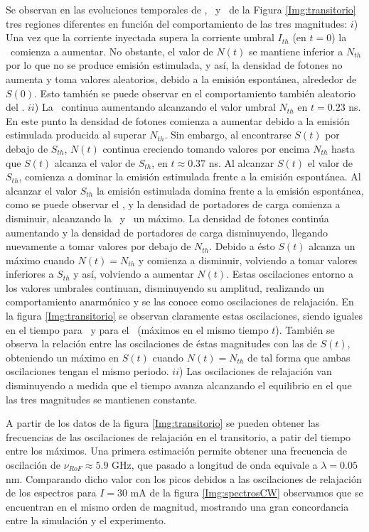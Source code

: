 				Se observan en las evoluciones temporales de \n, \s\ y \fase\ de la Figura \ref{Img:transitorio} tres regiones diferentes en funci\'on del comportamiento de las tres magnitudes: $i$) Una vez que la corriente inyectada supera la corriente umbral $I_{th}$ (en $t=0$) la \n\ comienza a aumentar. No obstante, el valor de $N(t)$ se mantiene inferior a $N_{th}$ por lo que no se produce emisión estimulada, y as\'i, la densidad de fotones no aumenta y toma valores aleatorios, debido a la emisi\'on espont\'anea, alrededor de $S(0)$. Esto tambi\'en se puede observar en el comportamiento tambi\'en aleatorio del \chirp. $ii$) La \n\ continua aumentando alcanzando el valor umbral $N_{th}$ en $t = 0.23$ ns. En este punto la densidad de fotones comienza a aumentar debido a la emisi\'on estimulada producida al superar $N_{th}$. Sin embargo, al encontrarse $S(t)$ por debajo de $S_{th}$, $N(t)$ continua creciendo tomando valores por encima $N_{th}$ hasta que $S(t)$ alcanza el valor de $S_{th}$, en $t \approx 0.37$ ns. Al alcanzar $S(t)$ el valor de $S_{th}$, comienza a dominar la emisi\'on estimulada frente a la emisi\'on espont\'anea. Al alcanzar el valor $S_{th}$ la emisi\'on estimulada domina frente a la emisi\'on espont\'anea, como se puede observar el \chirp, y la densidad de portadores de carga comienza a disminuir, alcanzando la \n\ y \chirp\ un m\'aximo. La densidad de fotones contin\'ua aumentando y la densidad de portadores de carga disminuyendo, llegando nuevamente a tomar valores por debajo de $N_{th}$. Debido a \'esto $S(t)$ alcanza un m\'aximo cuando $N(t) = N_{th}$ y comienza a disminuir, volviendo a tomar valores inferiores a $S_{th}$ y as\'i, volviendo a aumentar $N(t)$. Estas oscilaciones entorno a los valores umbrales continuan, disminuyendo su amplitud, realizando un comportamiento anarm\'onico y se las conoce como oscilaciones de relajaci\'on. En la figura \ref{Img:transitorio} se observan claramente estas oscilaciones, siendo iguales en el tiempo para \n\ y para el \chirp\ (m\'aximos en el mismo tiempo $t$). Tambi\'en se observa la relaci\'on entre las oscilaciones de \'estas magnitudes con las de $S(t)$, obteniendo un m\'aximo en $S(t)$ cuando $N(t) = N_{th}$ de tal forma que ambas oscilaciones tengan el mismo periodo. $ii$) Las oscilaciones de relajaci\'on van disminuyendo a medida que el tiempo avanza alcanzando el equilibrio en el que las tres magnitudes se mantienen constante.

				A partir de los datos de la figura \ref{Img:transitorio} se pueden obtener las frecuencias de las oscilaciones de relajaci\'on en el transitorio, a patir del tiempo entre los m\'aximos. Una primera estimaci\'on permite obtener una frecuencia de oscilaci\'on de $\nu_{RoF} \approx 5.9$ GHz, que pasado a longitud de onda equivale a $\lambda = 0.05$ nm. Comparando dicho valor con los picos debidos a las oscilaciones de relajaci\'on de los espectros para $I = 30$ mA de la figura \ref{Img:spectrosCW} observamos que se encuentran en el mismo orden de magnitud, mostrando una gran concordancia entre la simulaci\'on y el experimento.
